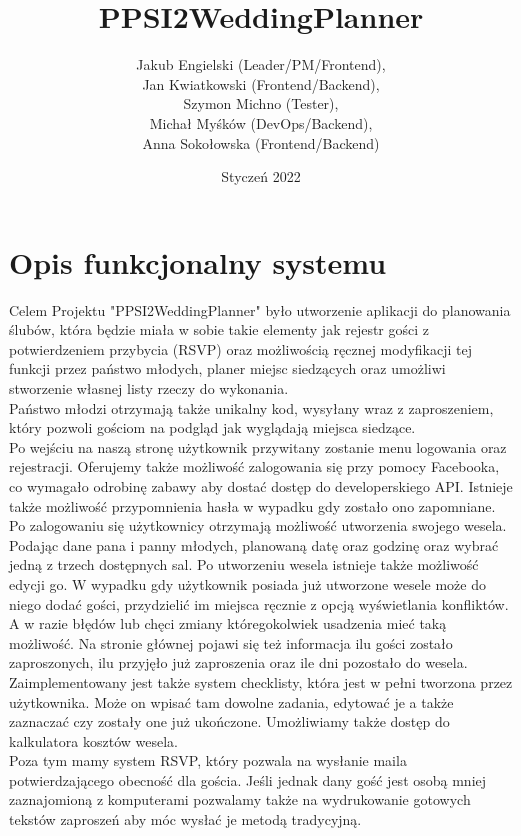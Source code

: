 \documentclass{article}
\title{PPSI2\textunderscore Wedding\textunderscore Planner}
\author{
Jakub Engielski (Leader/PM/Frontend),\\
Jan Kwiatkowski (Frontend/Backend), \\
Szymon Michno (Tester), \\
Michał Myśków (DevOps/Backend), \\
Anna Sokołowska (Frontend/Backend)
}
\date{Styczeń 2022}
\begin{document}
\maketitle

\section{Opis funkcjonalny systemu}
Celem Projektu "PPSI2\textunderscore Wedding\textunderscore Planner" było utworzenie aplikacji do planowania ślubów, która będzie miała w sobie takie elementy jak rejestr gości z potwierdzeniem przybycia (RSVP) oraz możliwością ręcznej modyfikacji tej funkcji przez państwo młodych, planer miejsc siedzących oraz umożliwi stworzenie własnej listy rzeczy do wykonania.
\\Państwo młodzi otrzymają także unikalny kod, wysyłany wraz z zaproszeniem, który pozwoli gościom na podgląd jak wyglądają miejsca siedzące.
\\Po wejściu na naszą stronę użytkownik przywitany zostanie menu logowania oraz rejestracji. Oferujemy także możliwość zalogowania się przy pomocy Facebooka, co wymagało odrobinę zabawy aby dostać dostęp do developerskiego API. Istnieje także możliwość przypomnienia hasła w wypadku gdy zostało ono zapomniane.
\\Po zalogowaniu się użytkownicy otrzymają możliwość utworzenia swojego wesela. Podając dane pana i panny młodych, planowaną datę oraz godzinę oraz wybrać jedną z trzech dostępnych sal. Po utworzeniu wesela istnieje także możliwość edycji go. W wypadku gdy użytkownik posiada już utworzone wesele może do niego dodać gości, przydzielić im miejsca ręcznie z opcją wyświetlania konfliktów. A w razie błędów lub chęci zmiany któregokolwiek usadzenia mieć taką możliwość. Na stronie głównej pojawi się też informacja ilu gości zostało zaproszonych, ilu przyjęło już zaproszenia oraz ile dni pozostało do wesela. 
\\
Zaimplementowany jest także system checklisty, która jest w pełni tworzona przez użytkownika. Może on wpisać tam dowolne zadania, edytować je a także zaznaczać czy zostały one już ukończone. Umożliwiamy także dostęp do kalkulatora kosztów wesela.
\\
Poza tym mamy system RSVP, który pozwala na wysłanie maila potwierdzającego obecność dla gościa. Jeśli jednak dany gość jest osobą mniej zaznajomioną z komputerami pozwalamy także na wydrukowanie gotowych tekstów zaproszeń aby móc wysłać je metodą tradycyjną.
\end{document}

